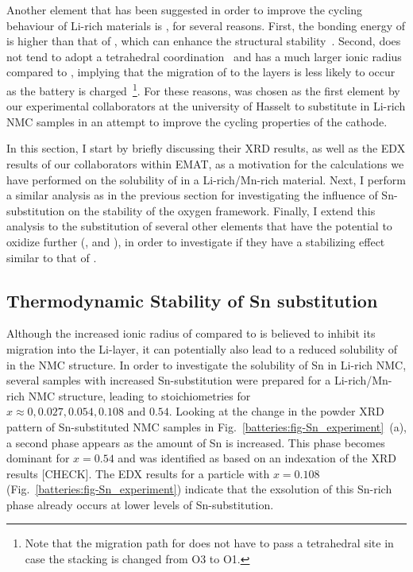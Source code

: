 \begin{refsection}
Another element that has been suggested in order to improve the cycling behaviour of Li-rich materials is , for several reasons. First, the bonding energy of  is higher than that of , which can enhance the structural stability~\cite{Qiao2015}. Second,  does not tend to adopt a tetrahedral coordination~\cite{Sathiya2013} and has a much larger ionic radius compared to , implying that the migration of  to the  layers is less likely to occur as the battery is charged~\footnote{Note that the migration path for  does not have to pass a tetrahedral site in case the stacking is changed from O3 to O1.}. For these reasons,  was chosen as the first element by our experimental collaborators at the university of Hasselt to substitute in Li-rich NMC samples in an attempt to improve the cycling properties of the cathode.

In this section, I start by briefly discussing their XRD results, as well as the EDX results of our collaborators within EMAT, as a motivation for the calculations we have performed on the solubility of  in a Li-rich/Mn-rich material. Next, I perform a similar analysis as in the previous section for investigating the influence of Sn-substitution on the stability of the oxygen framework. Finally, I extend this analysis to the substitution of several other elements that have the potential to oxidize further (,  and ), in order to investigate if they have a stabilizing effect similar to that of . 


\subsection{Thermodynamic Stability of Sn substitution} \label{batteries:sec-Sn_stability}

Although the increased ionic radius of  compared to  is believed to inhibit its migration into the Li-layer, it can potentially also lead to a reduced solubility of  in the NMC structure. In order to investigate the solubility of Sn in Li-rich NMC, several samples with increased Sn-substitution were prepared for a Li-rich/Mn-rich NMC structure, leading to stoichiometries  for $x  \approx 0, 0.027, 0.054, 0.108 \textrm{ and } 0.54$. Looking at the change in the powder XRD pattern of Sn-substituted NMC samples in Fig.~\ref{batteries:fig-Sn_experiment}~(a), a second phase appears as the amount of Sn is increased. This phase becomes dominant for $x=0.54$ and was identified as  based on an indexation of the XRD results [CHECK]. The EDX results for a particle with $x=0.108$ (Fig.~\ref{batteries:fig-Sn_experiment}) indicate that the exsolution of this Sn-rich phase already occurs at lower levels of Sn-substitution.


\end{refsection}
